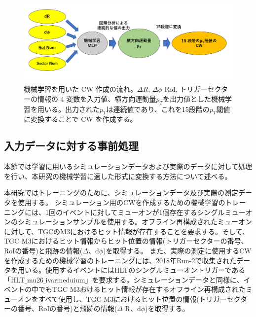 \begin{figure}[tb]
  \centering
  \includegraphics[clip, width=15cm]{fig/4/MLPoverview.png}
  \caption{機械学習を用いた CW 作成の流れ。$\Delta R$, $\Delta \phi$ RoI, トリガーセクターの情報の 4 変数を入力値、横方向運動量$p_T$を出力値とした機械学習を用いる。出力された$p_T$は連続値であり、これを15段階の$p_T$閾値に変換することで CW を作成する。}
  \label{fig:MLP_over}
\end{figure}

\subsection{入力データに対する事前処理}\label{事前処理}
本節では学習に用いるシミュレーションデータおよび実際のデータに対して処理を行い、本研究の機械学習に適した形式に変換する方法について述べる。

本研究ではトレーニングのために、シミュレーションデータ及び実際の測定データを使用する。
シミュレーション用のCWを作成するための機械学習のトレーニングには、1回のイベントに対してミューオンが1個存在するシングルミューオンのシミュレーションサンプルを使用する。オフライン再構成されたミューオンに対して、TGCのM3におけるヒット情報が存在することを要求する。そして、TGC M3におけるヒット情報からヒット位置の情報(トリガーセクターの番号、RoIの番号)と飛跡の情報($\Delta $、d$\phi$)を取得する。
また、実際の測定に使用するCWを作成するための機械学習のトレーニングには、2018年Run-2で収集されたデータを用いる。使用するイベントにはHLTのシングルミューオントリガーである「HLT$\_$mu26$\_$ivarmeduium」を要求する。シミュレーションデータと同様に、イベントの中でもTGC M3おけるヒット情報が存在するオフライン再構成されたミューオンをすべて使用し、TGC M3におけるヒット位置の情報(トリガーセクターの番号、RoIの番号)と飛跡の情報($\Delta$ R、d$\phi$)を取得する。


